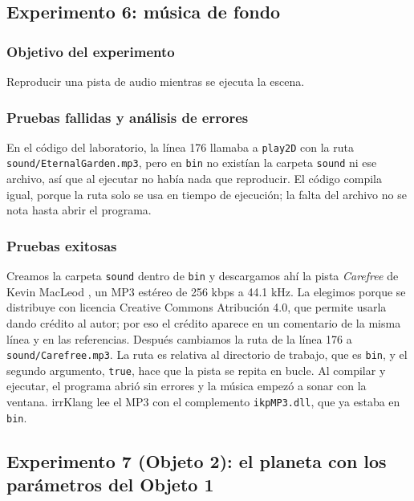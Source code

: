 \subsection{Experimento 6: música de fondo}

\subsubsection{Objetivo del experimento}
Reproducir una pista de audio mientras se ejecuta la escena.

\subsubsection{Pruebas fallidas y análisis de errores}
En el código del laboratorio, la línea 176 llamaba a \texttt{play2D} con la ruta \texttt{sound/EternalGarden.mp3}, pero en \texttt{bin} no existían la carpeta \texttt{sound} ni ese archivo, así que al ejecutar no había nada que reproducir. El código compila igual, porque la ruta solo se usa en tiempo de ejecución; la falta del archivo no se nota hasta abrir el programa.

\subsubsection{Pruebas exitosas}
Creamos la carpeta \texttt{sound} dentro de \texttt{bin} y descargamos ahí la pista \textit{Carefree} de Kevin MacLeod \cite{macleod_carefree}, un MP3 estéreo de 256 kbps a 44.1 kHz. La elegimos porque se distribuye con licencia Creative Commons Atribución 4.0, que permite usarla dando crédito al autor; por eso el crédito aparece en un comentario de la misma línea y en las referencias. Después cambiamos la ruta de la línea 176 a \texttt{sound/Carefree.mp3}. La ruta es relativa al directorio de trabajo, que es \texttt{bin}, y el segundo argumento, \texttt{true}, hace que la pista se repita en bucle. Al compilar y ejecutar, el programa abrió sin errores y la música empezó a sonar con la ventana. irrKlang lee el MP3 con el complemento \texttt{ikpMP3.dll}, que ya estaba en \texttt{bin}.

\subsection{Experimento 7 (Objeto 2): el planeta con los parámetros del Objeto 1}

